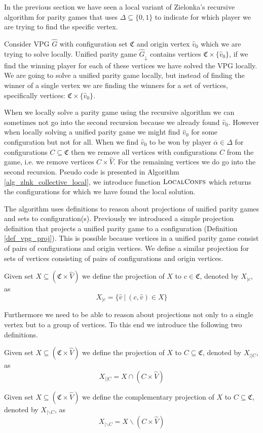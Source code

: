 In the previous section we have seen a local variant of Zielonka's recursive algorithm for parity games that uses $\Delta \subseteq \{0,1\}$ to indicate for which player we are trying to find the specific vertex.

Consider VPG $\hat{G}$ with configuration set $\mathfrak{C}$ and origin vertex $\hat{v}_0$ which we are trying to solve locally. Unified parity game $\hat{G}_{\downarrow}$ contains vertices $\mathfrak{C} \times \{\hat{v}_0\}$, if we find the winning player for each of these vertices we have solved the VPG locally. We are going to solve a unified parity game locally, but instead of finding the winner of a single vertex we are finding the winners for a set of vertices, specifically vertices: $\mathfrak{C} \times \{\hat{v}_0\}$.

When we locally solve a parity game using the recursive algorithm we can sometimes not go into the second recursion because we already found $\hat{v}_0$. However when locally solving a unified parity game we might find $\hat{v}_0$ for some configuration but not for all. When we find $\hat{v}_0$ to be won by player $\overline{\alpha} \in \Delta$ for configurations $C \subseteq \mathfrak{C}$ then we remove all vertices with configurations $C$ from the game, i.e. we remove vertices $C \times \hat{V}$. For the remaining vertices we do go into the second recursion. Pseudo code is presented in Algorithm \ref{alg_zlnk_collective_local}, we introduce function $\textsc{LocalConfs}$ which returns the configurations for which we have found the local solution.

The algorithm uses definitions to reason about projections of unified parity games and sets to configuration(s). Previously we introduced a simple projection definition that projects a unified parity game to a configuration (Definition \ref{def_vpg_proj}). This is possible because vertices in a unified parity game consist of pairs of configurations and origin vertices. We define a similar projection for sets of vertices consisting of pairs of configurations and origin vertices.
\begin{definition}
	Given set $X \subseteq (\mathfrak{C} \times \hat{V})$ we define the projection of $X$ to $c \in \mathfrak{C}$, denoted by $X_{|c}$, as
	\[ X_{|c} = \{ \hat{v}\ |\ (c,\hat{v}) \in X \} \]
\end{definition}
Furthermore we need to be able to reason about projections not only to a single vertex but to a group of vertices. To this end we introduce the following two definitions.
\begin{definition}
	Given set $X \subseteq (\mathfrak{C} \times \hat{V})$ we define the projection of $X$ to $C \subseteq \mathfrak{C}$, denoted by $X_{||C}$, as
	\[ X_{||C} = X \cap (C \times \hat{V}) \]
\end{definition}
\begin{definition}
Given set $X \subseteq (\mathfrak{C} \times \hat{V})$ we define the complementary projection of $X$ to $C \subseteq \mathfrak{C}$, denoted by $X_{|\backslash C}$, as
\[ X_{|\backslash C} = X \backslash (C \times \hat{V}) \]
\end{definition}

